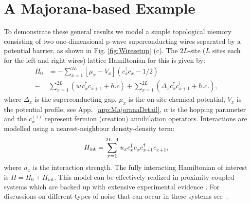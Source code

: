 \documentclass[aps,pra,floatfix,footinbib,longbibliography,twocolumn,superscriptaddress, preprintnumbers, nobibnotes]{revtex4-1}
\begin{document}
\section{A Majorana-based Example}\label{sec:MajoranaEx}
To demonstrate these general results we model a simple topological memory consisting of two one-dimensional p-wave superconducting wires separated by a potential barrier, as shown in Fig. \ref{fig:Wiresetup} (c). The $2L$-site ($L$ sites each for the left and right wires) lattice Hamiltonian \cite{Kitaev2001} for this is given by:
\begin{equation}
\label{eq:Hamiltonian}
\begin{split}
	H_0 &=  - \sum_{x=1}^{2L} [\mu_x-V_x]  (c^\dagger_{x}c_{x }-1/2) \\
	-&  \sum_{x=1}^{2L} (w \, c^\dagger_{x}c_{x+1} + h.c) + \sum_{x=1}^{2L}(\Delta_x c^\dagger_{x} c^\dagger_{x+1} + h.c. ),
\end{split}
\end{equation}
where $\Delta_x$ is the superconducting gap, $\mu_x$ is the on-site chemical potential, $V_x$ is the potential profile, see App.~\ref{app:MajoranaDetail}, $w$ is the hopping parameter and the $c^{(\dagger)}_x$ represent fermion (creation) annihilation operators. Interactions are modelled using a nearest-neighbour density-density term:
	\begin{equation}\label{eq:Hint}
	H_{\text{int}}= \sum_{x=1}^{2L-1} u_x c^\dagger_x c^\phd_x c^\dagger_{x+1} c^\phd_{x+1},\end{equation}
where $u_x$ is the interaction strength. The fully interacting Hamiltonian of interest is $H = H_0 + H_{\text{int}}$. This model can be effectively realized in proximity coupled systems \cite{Fu2008,Lutchyn2010,Oreg2010,Sau2011,AliceaNat2011,Stanescu2013} which are backed up with extensive experimental evidence \cite{Kouwenhoven2012,Deng2012,
Das2012,Finck2013,Churchill2013,
Albrecht2016,Zhang2016,Deng2016,
NadjPerge2014,Ruby2015,Pawlak2016,
Zhang2018,Marcus2019,Falko2019}.  For discussions on different types of noise that can occur in these systems see~\cite{Rainis2012,Budich2012,Roy2012,Konschelle2013,Yang2014,Ng2015,Pedrocchi2015,Hu2015,Ippoliti2016,Brown2016,Aseev2018,Knapp2018,Zhang2019,Karzig2013,Scheurer2013,Conlon2019,coopmans2020protocol}. 
\end{document}
